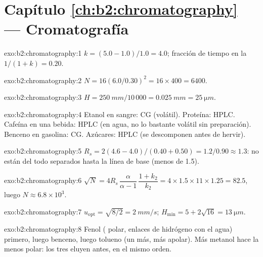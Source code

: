 \section*{Capítulo \ref{ch:b2:chromatography} --- Cromatografía}

\begin{solution}{exo:b2:chromatography:1}
$k = (5.0 - 1.0)/1.0 = 4.0$; fracción de tiempo en la  $1/(1 + k) = 0.20$.
\end{solution}

\begin{solution}{exo:b2:chromatography:2}
$N = 16(6.0/0.30)^2 = 16 \times 400 = 6400$.
\end{solution}

\begin{solution}{exo:b2:chromatography:3}
$H = \qty{250}{mm}/10\,000 = \qty{0.025}{mm} = \qty{25}{\micro m}$.
\end{solution}

\begin{solution}{exo:b2:chromatography:4}
Etanol en sangre: CG (volátil). Proteína: HPLC. Cafeína en una bebida: HPLC (en agua, no lo bastante volátil
sin preparación). Benceno en gasolina: CG. Azúcares: HPLC (se descomponen antes de hervir).
\end{solution}

\begin{solution}{exo:b2:chromatography:5}
$R_s = 2(4.6 - 4.0)/(0.40 + 0.50) = 1.2/0.90 \approx 1.3$: no están del todo separados hasta la línea de base (menos de 1.5).
\end{solution}

\begin{solution}{exo:b2:chromatography:6}
$\sqrt N = 4R_s\,\dfrac{\alpha}{\alpha - 1}\,\dfrac{1 + k_2}{k_2} = 4 \times 1.5 \times 11 \times 1.25 =
82.5$, luego $N \approx 6.8 \times 10^3$.
\end{solution}

\begin{solution}{exo:b2:chromatography:7}
$u_{\mathrm{opt}} = \sqrt{8/2} = \qty{2}{mm/s}$; $H_{\min} = 5 + 2\sqrt{16} = \qty{13}{\micro m}$.
\end{solution}

\begin{solution}{exo:b2:chromatography:8}
Fenol ( polar, enlaces de hidrógeno con el agua) primero, luego benceno, luego tolueno (un 
más, más apolar). Más metanol hace la  menos polar: los tres eluyen antes, en
el mismo orden.
\end{solution}

